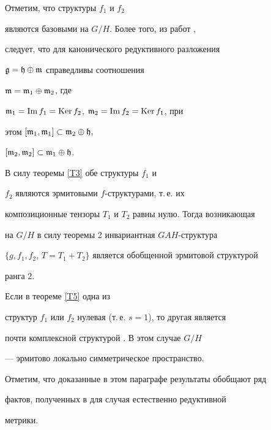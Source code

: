 \begin{pf}


Отметим, что структуры $f_1$ и $f_2$


являются базовыми на $G/H$. Более того, из работ \cite{13},


\cite{19} следует, что для канонического редуктивного разложения


$\frak{g}=\frak{h}\oplus\frak{m}$ справедливы соотношения


$\frak{m}=\frak{m}_1\oplus\frak{m}_2$, где


$\frak{m}_1=\operatorname{Im} f_1=\operatorname{Ker} f_2$, $\frak{m}_2=\operatorname{Im} f_2=\operatorname{Ker} f_1$, при


этом $[\frak{m}_1,\frak{m}_1] \subset \frak{m}_2\oplus\frak{h},$


$[\frak{m}_2,\frak{m}_2] \subset \frak{m}_1\oplus\frak{h}$.





В силу теоремы \ref{T3} обе структуры $f_1$ и


$f_2$ являются эрмитовыми $f$-структурами, т.\,е. их


композиционные тензоры $T_1$ и $T_2$ равны нулю. Тогда возникающая


на $G/H$ в силу теоремы 2 инвариантная $GAH$-структура


$\{g,f_1,f_2$, $T=T_1+T_2\}$ является обобщенной эрмитовой структурой


ранга 2.


\end{pf}





\begin{note}


Если в теореме \ref{T5} одна из


структур $f_1$ или $f_2$ нулевая (т.\,е. $s=1$), то другая является


почти комплексной структурой \cite{13}. В этом случае $G/H$


--- эрмитово локально симметрическое пространство.


\end{note}





Отметим, что доказанные в этом параграфе результаты обобщают ряд


фактов, полученных в \cite{16}  для случая естественно редуктивной


метрики.





